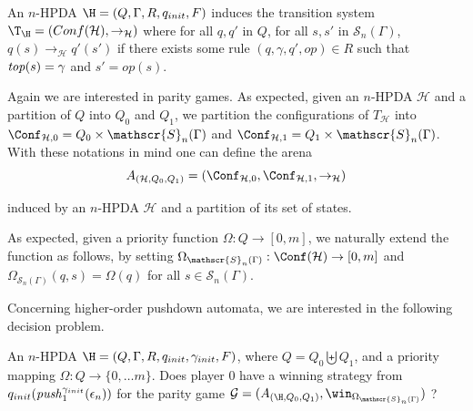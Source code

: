 An $n$-HPDA $\H=(Q, \Gamma, R, q_{init}, F)$
induces the transition system $\T_\H = (Conf(\mathcal{H}), \rightarrow_{\mathcal{H}})$
where
for all $q,q'$ in $Q$,
for all $s,s'$ in $\mathscr{S}_n(\Gamma)$,
$q(s) \rightarrow_{\mathcal{H}} q'(s')$ if
there exists some rule
$(q,\gamma,q',op) \in R$
such that
$\text{\textit{top}}(s) = \gamma$
and
$s' = op(s)$.

Again we are interested in parity games.
As expected, given an 
 $n$-HPDA $\mathcal{H}$
 and a partition of
$Q$ into $Q_0$ and $Q_1$,
we partition the configurations of
$T_{\mathcal{H}}$
into
$\Conf_{\mathcal{H},0}=Q_0\times \mathscr{S}_n(\Gamma)$
and
$\Conf_{\mathcal{H},1}=Q_1\times\mathscr{S}_n(\Gamma)$.
%
%
With these notations in mind one can define the arena
$$
A_{(\mathcal{H}, Q_0, Q_1)}
=
(\Conf_{\mathcal{H},0}, \Conf_{\mathcal{H},1}, \rightarrow_{\mathcal{H}})$$
\par\noindent\ignorespacesafterend
induced by an $n$-HPDA $\mathcal{H}$ and a partition of its set of states.


As expected, given a 
priority function $\Omega: Q \to [0, m]$,
we naturally extend the function
as follows,
by setting
$\Omega_{\mathscr{S}_n(\Gamma)}: \Conf(\mathcal{H}) \to [0, m]$
and
$\Omega_{\mathscr{S}_n(\Gamma)}(q, s) = \Omega(q)$
for all
$s \in \mathscr{S}_n(\Gamma)$.





Concerning higher-order pushdown automata, we are interested in the following decision problem. 

\begin{samepage}
{An $n$-HPDA $\H= (Q, \Gamma,  R, q_{init}, {\gamma_{init}} , F)$, 
where $Q = Q_0  \biguplus Q_1 $, 
and
a priority mapping $\Omega: Q \to \{0, \ldots m\}$.}
{Does player $0$ have a winning strategy 
from $q_{init}(\text{\textit{push}}_1^{\gamma_{init}}(\epsilon_{n}))$ 
for the parity game 
$\mathcal{G}= (A_{(\H, Q_0 , Q_1)}, \win_{\Omega_{\mathscr{S}_n(\Gamma)}})$ ?\newline}
\end{samepage}

